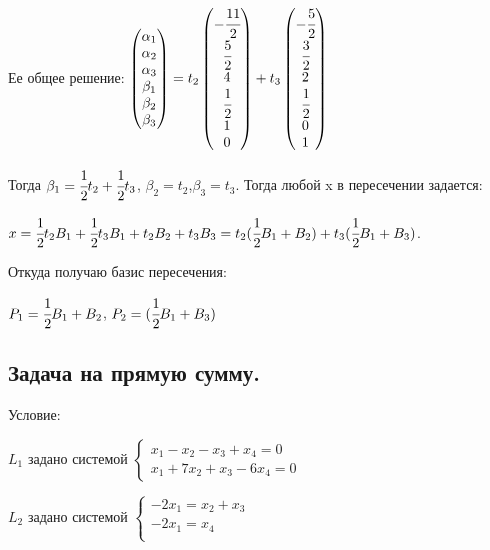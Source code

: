 \documentclass{article}
\begin{document}
Ее общее решение: $\begin{pmatrix}
    \alpha_1 \\
    \alpha_2 \\
    \alpha_3 \\
    \beta_1 \\
    \beta_2 \\
    \beta_3
\end{pmatrix} = t_2 \begin{pmatrix}
   -\cfrac{11}{2} \\
    \cfrac{5}{2} \\
    4 \\
    \cfrac{1}{2} \\
    1 \\
    0
\end{pmatrix} +  t_3 \begin{pmatrix}
   -\cfrac{5}{2} \\
    \cfrac{3}{2} \\
    2 \\
    \cfrac{1}{2} \\
    0 \\
    1
\end{pmatrix}$

Тогда $\beta_1 = \cfrac{1}{2}t_2 + \cfrac{1}{2}t_3$, $\beta_2 = t_2$,$\beta_3 = t_3$.  Тогда любой x в пересечении задается:

$x = \cfrac{1}{2}t_2 B_1 + \cfrac{1}{2}t_3 B_1 + t_2 B_2 + t_3 B_3 = t_2(\cfrac{1}{2} B_1 + B_2) + t_3 (\cfrac{1}{2} B_1 + B_3)$.

Откуда получаю базис пересечения:

$P_1 = \cfrac{1}{2} B_1 + B_2$, $P_2 = (\cfrac{1}{2} B_1 + B_3)$

\pagebreak

\pagebreak

\subsection{Задача на прямую сумму.}

Условие: 

$L_1$ задано системой 
$
\begin{cases}
    x_1-x_2-x_3+x_4=0\\
    x_1 + 7x_2 + x_3 - 6 x_4 = 0
\end{cases}
$

$L_2$ задано системой 
$
\begin{cases}
   -2x_1=x_2 +x_3\\
   -2x_1 = x_4 \\
\end{cases}
$
\end{document}
